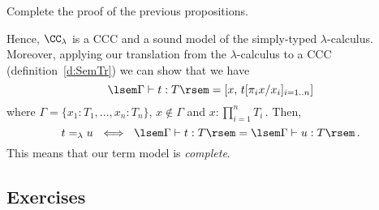 \documentclass{svmult}
\begin{document}
\begin{myexercise}
Complete the proof of the previous propositions.
\end{myexercise}
%
%
Hence, $\CC_\lambda$ is a CCC and a sound model of the simply-typed $\lambda$-calculus. Moreover, applying our translation from the $\lambda$-calculus to a CCC (definition~\ref{d:SemTr}) we can show that we have
\[ \lsem\Gamma\vdash t:T\rsem = [x,\, t[\pi_ix/x_i]_{i=1..n}] \]
where $\Gamma=\{x_1:T_1,...,x_n:T_n\}$, $x\notin\Gamma$ and $x:\prod_{i=1}^n T_i$\,. Then,
\[ t=_\lambda u \ \iff \ \lsem\Gamma\vdash t:T\rsem = \lsem\Gamma\vdash u:T\rsem\,.  \]
This means that our term model is \emph{complete}.

\subsection{Exercises}\label{ex:CH}
\end{document}
